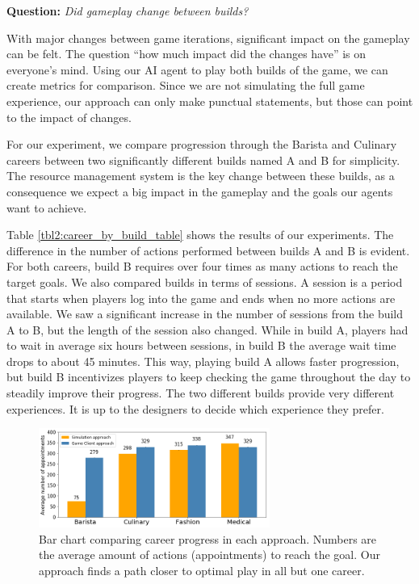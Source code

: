 \documentclass[letterpaper]{article} %
\begin{document}
\textbf{Question:} {\em Did gameplay change between builds?}

With major changes between game iterations, significant impact on the gameplay can be felt. The question ``how much impact did the changes have'' is on everyone's mind. Using our AI agent to play both builds of the game, we can create metrics for comparison. Since we are not simulating the full game experience, our approach can only make punctual statements, but those can point to the impact of changes.

For our experiment, we compare progression through the Barista and Culinary careers between two significantly different builds named A and B for simplicity. The resource management system is the key change between these builds, as a consequence we expect a big impact in the gameplay and the goals our agents want to achieve.


\vspace{-1.59mm}
\vspace{-3.18mm}
Table \ref{tbl2:career_by_build_table} shows the results of our experiments. The difference in the number of actions performed between builds A and B is evident. For both careers, build B requires over four times as many actions to reach the target goals. We also compared builds in terms of sessions. A session is a period that starts when players log into the game and ends when no more actions are available. We saw a significant increase in the number of sessions from the build A to B, but the length of the session also changed. While in build A, players had to wait in average six hours between sessions, in build B the average wait time drops to about 45 minutes. This way, playing build A allows faster progression, but build B incentivizes players to keep checking the game throughout the day to steadily improve their progress. The two different builds provide very different experiences. It is up to the designers to decide which experience they prefer.


\begin{figure}[t]
\centering
\includegraphics[width=0.9\linewidth,height=1.278in ]{images/career_approach_comparison.png}
\caption{Bar chart comparing career progress in each approach. Numbers are the average amount of actions (appointments) to reach the goal. Our approach finds a path closer to optimal play in all but one career.}
\label{Figure:career_approach_comp}
\end{figure}
\end{document}
